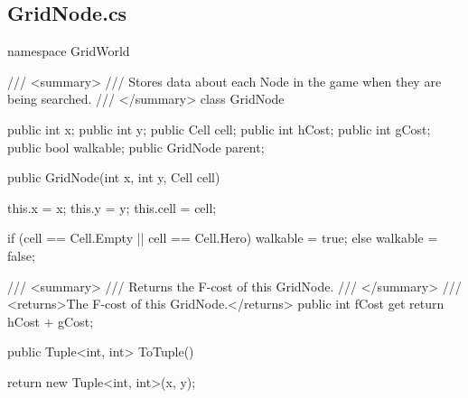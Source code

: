 \documentclass[11pt]{article}
\begin{document}
\subsection*{GridNode.cs}
\begin{code}
namespace GridWorld
{
    /// <summary>
    /// Stores data about each Node in the game when they are being searched.
    /// </summary>
    class GridNode
    {
        public int x;
        public int y;
        public Cell cell;
        public int hCost;
        public int gCost;
        public bool walkable;
        public GridNode parent;

       public GridNode(int x, int y, Cell cell){

            this.x = x;
            this.y = y;
            this.cell = cell;

            if (cell == Cell.Empty || cell == Cell.Hero)
            {
                walkable = true;
            }
            else
            {
                walkable = false;
            }

        }

        /// <summary>
        /// Returns the F-cost of this GridNode.
        /// </summary>
        /// <returns>The F-cost of this GridNode.</returns>
        public int fCost
        {
            get
            {
                return hCost + gCost;
            }
        }

        public Tuple<int, int> ToTuple()
        {

            return new Tuple<int, int>(x, y);
        }


    }
}

\end{code}
\end{document}
